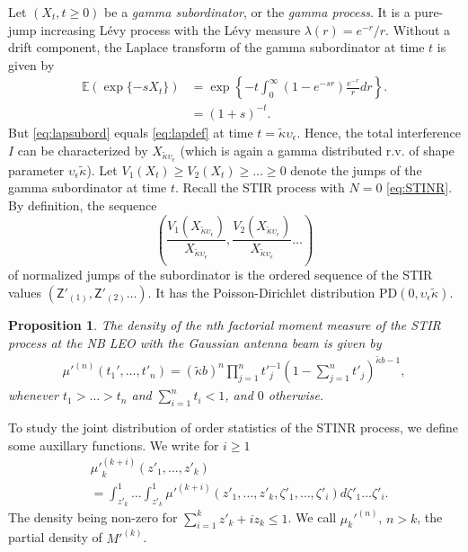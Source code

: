 \documentclass[lettersize,journal]{IEEEtran}
\newtheorem{prop}[theorem]{Proposition}
\begin{document}
Let $(X_{t}, t \geq 0)$ be a \textit{gamma subordinator}, or the \textit{gamma process}. It is a pure-jump increasing Lévy process with the Lévy measure $\lambda(r) = e^{- r}/r$. Without a drift component, the Laplace transform of the gamma subordinator at time $t$ is given by
\begin{align}
  \label{eq:lapsubord}
  \mathbb{E}(\exp\{-s X_{t}\}) &= \exp\left\{-{t} \int_0^{\infty}(1-e^{-s r})\frac{e^{-r}}{r} dr \right\}. \nonumber \\
  &=(1+s)^{-t}.
\end{align}
But \eqref{eq:lapsubord} equals \eqref{eq:lapdef} at time $t=\tilde{\kappa}\upsilon_{\epsilon} $. Hence, the total interference $I$ can be characterized by $X_{\tilde{\kappa} \upsilon_{\epsilon}}$ (which is again a gamma distributed r.v. of shape parameter $\upsilon_{\epsilon}\tilde{\kappa}$). Let $V_1(X_{t}) \geq V_2(X_{t})\geq \dots \geq 0 $ denote the jumps of the gamma subordinator at time $t$. Recall the STIR process with $N=0$ \eqref{eq:STINR}. By definition, the sequence
\begin{equation}
  \label{eq:relativesequence}
  \left(\frac{V_1(X_{\tilde{\kappa}\upsilon_{\epsilon}})}{X_{\tilde{\kappa}\upsilon_{\epsilon}}},\frac{V_2(X_{\tilde{\kappa}\upsilon_{\epsilon}})}{X_{\tilde{\kappa}\upsilon_{\epsilon}}} \dots \right)
\end{equation}
of normalized jumps of the subordinator is the ordered sequence of the STIR values $(\mathsf{Z}'_{(1)},\mathsf{Z}'_{(2)} \dots)$. It has the Poisson-Dirichlet distribution PD$(0, \upsilon_{\epsilon} \tilde{\kappa})$. 




\begin{prop}
  The density of the n\textit{th} factorial moment measure of the STIR process at the NB LEO with the Gaussian antenna beam is given by
  \begin{align}
    \label{eq:factorialmoment}
    \mu'^{(n)}(t_1',\dots,t'_n) = (\tilde{\kappa}b)^n\prod_{j=1}^n{t'}_{j}^{-1}\left(1- \sum_{j=1}^nt'_j \right)^{\tilde{\kappa}b-1},       
  \end{align}
  whenever $t_1>\dots >t_n$ and $\sum_{i=1}^n t_i <1$, and $0$ otherwise.
\end{prop}
To study the joint distribution of order statistics of the STINR process, we define some auxillary functions. We write for $i\geq 1$
\begin{align}
  \label{eq:auxillary}
  &{\mu'}_k^{(k+i)}(z'_1,\dots,z'_k) \nonumber \\
  &= \int_{z'_k}^1 \dots \int_{z'_k}^1 {\mu'}^{(k+i)}(z'_1,\dots,z'_k,\zeta'_1,\dots,\zeta'_i) d\zeta'_1 \dots \zeta'_i.
\end{align}
The density being non-zero for $\sum_{i=1}^kz'_k+iz_k \leq 1 $. We call $\mu_{k}'^{(n)}$, $n>k$, the partial density of $M'^{(k)}$.
\end{document}
